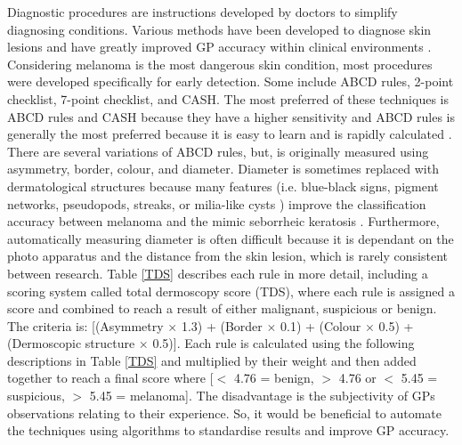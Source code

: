 \documentclass[10.5pt]{report}
\begin{document}
Diagnostic procedures are instructions developed by doctors to simplify diagnosing conditions. Various methods have been developed to diagnose skin lesions and have greatly improved GP accuracy within clinical environments \cite{Nachbar, unlu2014}. Considering melanoma is the most dangerous skin condition, most procedures were developed specifically for early detection. Some include ABCD rules, 2-point checklist, 7-point checklist, and CASH. The most preferred of these techniques is ABCD rules and CASH because they have a higher sensitivity \cite{unlu2014} and ABCD rules is generally the most preferred because it is easy to learn and is rapidly calculated \cite{Nachbar}. There are several variations of ABCD rules, but, is originally measured using asymmetry, border, colour, and diameter. Diameter is sometimes replaced with dermatological structures because many features (i.e. blue-black signs, pigment networks, pseudopods, streaks, or milia-like cysts \cite{Stricklin2011}) improve the classification accuracy between melanoma and the mimic seborrheic keratosis \cite{Cognetta1994}. Furthermore, automatically measuring diameter is often difficult because it is dependant on the photo apparatus and the distance from the skin lesion, which is rarely consistent between research. Table \ref{TDS} describes each rule in more detail, including a scoring system called total dermoscopy score (TDS), where each rule is assigned a score and combined to reach a result of either malignant, suspicious or benign. The criteria is: [(Asymmetry $\times$ 1.3) + (Border $\times$ 0.1) + (Colour $\times$ 0.5) + (Dermoscopic structure $\times$ 0.5)]. Each rule is calculated using the following descriptions in Table \ref{TDS} and multiplied by their weight and then added together to reach a final score where [$<$ 4.76 = benign, $>$ 4.76 or $<$ 5.45 = suspicious, $>$ 5.45 = melanoma]. The disadvantage is the subjectivity of GPs observations relating to their experience. So, it would be beneficial to automate the techniques using algorithms to standardise results and improve GP accuracy.
\end{document}
